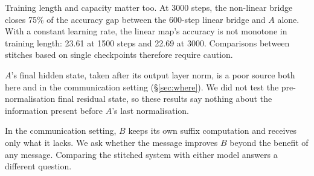 Training length and capacity matter too. At 3000 steps, the non-linear bridge closes 75\% of the accuracy gap between the 600-step linear bridge and $A$ alone. With a constant learning rate, the linear map's accuracy is not monotone in training length: 23.61 at 1500 steps and 22.69 at 3000. Comparisons between stitches based on single checkpoints therefore require caution.

$A$'s final hidden state, taken after its output layer norm, is a poor source both here and in the communication setting (\S\ref{sec:where}). We did not test the pre-normalisation final residual state, so these results say nothing about the information present before $A$'s last normalisation.

In the communication setting, $B$ keeps its own suffix computation and receives only what it lacks. We ask whether the message improves $B$ beyond the benefit of any message. Comparing the stitched system with either model answers a different question.
